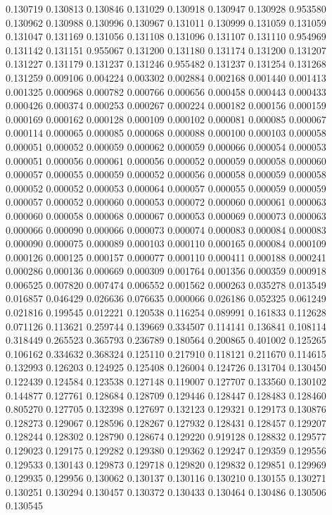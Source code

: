 0.130719
0.130813
0.130846
0.131029
0.130918
0.130947
0.130928
0.953580
0.130962
0.130988
0.130996
0.130967
0.131011
0.130999
0.131059
0.131059
0.131047
0.131169
0.131056
0.131108
0.131096
0.131107
0.131110
0.954969
0.131142
0.131151
0.955067
0.131200
0.131180
0.131174
0.131200
0.131207
0.131227
0.131179
0.131237
0.131246
0.955482
0.131237
0.131254
0.131268
0.131259
0.009106
0.004224
0.003302
0.002884
0.002168
0.001440
0.001413
0.001325
0.000968
0.000782
0.000766
0.000656
0.000458
0.000443
0.000433
0.000426
0.000374
0.000253
0.000267
0.000224
0.000182
0.000156
0.000159
0.000169
0.000162
0.000128
0.000109
0.000102
0.000081
0.000085
0.000067
0.000114
0.000065
0.000085
0.000068
0.000088
0.000100
0.000103
0.000058
0.000051
0.000052
0.000059
0.000062
0.000059
0.000066
0.000054
0.000053
0.000051
0.000056
0.000061
0.000056
0.000052
0.000059
0.000058
0.000060
0.000057
0.000055
0.000059
0.000052
0.000056
0.000058
0.000059
0.000058
0.000052
0.000052
0.000053
0.000064
0.000057
0.000055
0.000059
0.000059
0.000057
0.000052
0.000060
0.000053
0.000072
0.000060
0.000061
0.000063
0.000060
0.000058
0.000068
0.000067
0.000053
0.000069
0.000073
0.000063
0.000066
0.000090
0.000066
0.000073
0.000074
0.000083
0.000084
0.000083
0.000090
0.000075
0.000089
0.000103
0.000110
0.000165
0.000084
0.000109
0.000126
0.000125
0.000157
0.000077
0.000110
0.000411
0.000188
0.000241
0.000286
0.000136
0.000669
0.000309
0.001764
0.001356
0.000359
0.000918
0.006525
0.007820
0.007474
0.006552
0.001562
0.000263
0.035278
0.013549
0.016857
0.046429
0.026636
0.076635
0.000066
0.026186
0.052325
0.061249
0.021816
0.199545
0.012221
0.120538
0.116254
0.089991
0.161833
0.112628
0.071126
0.113621
0.259744
0.139669
0.334507
0.114141
0.136841
0.108114
0.318449
0.265523
0.365793
0.236789
0.180564
0.200865
0.401002
0.125265
0.106162
0.334632
0.368324
0.125110
0.217910
0.118121
0.211670
0.114615
0.132993
0.126203
0.124925
0.125408
0.126004
0.124726
0.131704
0.130450
0.122439
0.124584
0.123538
0.127148
0.119007
0.127707
0.133560
0.130102
0.144877
0.127761
0.128684
0.128709
0.129446
0.128447
0.128483
0.128460
0.805270
0.127705
0.132398
0.127697
0.132123
0.129321
0.129173
0.130876
0.128273
0.129067
0.128596
0.128267
0.127932
0.128431
0.128457
0.129207
0.128244
0.128302
0.128790
0.128674
0.129220
0.919128
0.128832
0.129577
0.129023
0.129175
0.129282
0.129380
0.129362
0.129247
0.129359
0.129556
0.129533
0.130143
0.129873
0.129718
0.129820
0.129832
0.129851
0.129969
0.129935
0.129956
0.130062
0.130137
0.130116
0.130210
0.130155
0.130271
0.130251
0.130294
0.130457
0.130372
0.130433
0.130464
0.130486
0.130506
0.130545
